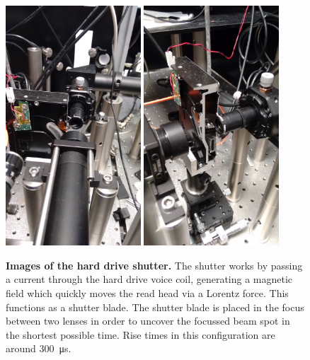 \documentclass[12pt, a4paper, twoside]{book}
\begin{document}
\begin{figure}[bt]
\centering
\includegraphics[width=0.45\textwidth, clip=true, trim=0 1300 500 900]{figures/hard_drive_shutter_1}
\includegraphics[width=0.45\textwidth, clip=true, trim=0 1000 0 800]{figures/hard_drive_shutter_2}
\caption[Images of the hard drive shutter]{\textbf{Images of the hard drive shutter.} The shutter works by passing a current through the hard drive voice coil, generating a magnetic field which quickly moves the read head via a Lorentz force. This functions as a shutter blade. The shutter blade is placed in the focus between two lenses in order to uncover the focussed beam spot in the shortest possible time. Rise times in this configuration are around \SI{300}{\micro\second}.}
\label{fig:hard_drive_shutter}
\end{figure}
\end{document}
